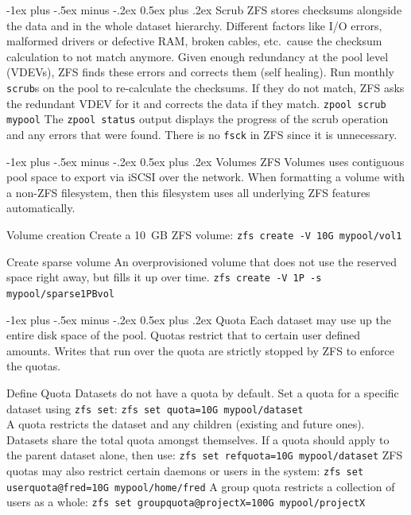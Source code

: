 \documentclass[10pt,landscape,letter]{article}
\makeatletter
\renewcommand{\section}{\@startsection{section}{1}{0mm}%
                                {-1ex plus -.5ex minus -.2ex}%
                                {0.5ex plus .2ex}%
                                {\normalfont\large\bfseries}}
\makeatother
\begin{document}
\begin{multicols}{3}
  \section{Scrub} ZFS stores checksums alongside the data and in the whole
  dataset hierarchy. Different factors like I/O errors, malformed drivers or
  defective RAM, broken cables, etc.\ cause the checksum calculation to not
  match anymore. Given enough redundancy at the pool level (VDEVs), ZFS finds
  these errors and corrects them (self healing). Run monthly \texttt{scrub}s on
  the pool to re-calculate the checksums. If they do not match, ZFS asks the
  redundant VDEV for it and corrects the data if they match. \texttt{zpool
  scrub mypool} The \texttt{zpool status} output displays the progress of the
  scrub operation and any errors that were found. There is no \texttt{fsck} in
  ZFS since it is unnecessary.

	\section{Volumes}
  ZFS Volumes uses contiguous pool space to export via iSCSI over the network. When
  formatting a volume with a non-ZFS filesystem, then this filesystem uses
  all underlying ZFS features automatically.
	\begin{Description}
    \item[Volume creation] Create a 10~GB ZFS volume:
      \texttt{zfs create -V 10G mypool/vol1}
    \item[Create sparse volume] An overprovisioned volume that does not
      use the reserved space right away, but fills it up over time.
      \texttt{zfs create -V 1P -s mypool/sparse1PBvol}
	\end{Description}



  \newpage

	\section{Quota}
  Each dataset may use up the entire disk space of the pool. Quotas restrict
  that to certain user defined amounts. Writes that run over the quota are
  strictly stopped by ZFS to enforce the quotas.

	\begin{Description}

    \item[Define Quota] Datasets do not have a quota by
      default. Set a quota for a specific dataset using \texttt{zfs set}:
      \texttt{zfs set quota=10G mypool/dataset}\\ A quota restricts the
      dataset and any children (existing and future ones). Datasets
      share the total quota amongst themselves. If a quota should  apply to the
      parent dataset alone, then use: \texttt{zfs set refquota=10G mypool/dataset} ZFS quotas
      may also restrict certain daemons or users in the system: \texttt{zfs set
      userquota@fred=10G mypool/home/fred} A group quota restricts a collection
      of users as a whole: \texttt{zfs set groupquota@projectX=100G mypool/projectX}


\end{Description}
\end{multicols}
\end{document}
